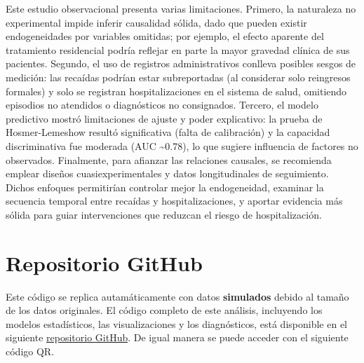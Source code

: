 \documentclass[
  spanish,
  10pt,
]{article}
\begin{document}
Este estudio observacional presenta varias limitaciones. Primero, la
naturaleza no experimental impide inferir causalidad sólida, dado que
pueden existir endogeneidades por variables omitidas; por ejemplo, el
efecto aparente del tratamiento residencial podría reflejar en parte la
mayor gravedad clínica de sus pacientes. Segundo, el uso de registros
administrativos conlleva posibles sesgos de medición: las recaídas
podrían estar subreportadas (al considerar solo reingresos formales) y
solo se registran hospitalizaciones en el sistema de salud, omitiendo
episodios no atendidos o diagnósticos no consignados. Tercero, el modelo
predictivo mostró limitaciones de ajuste y poder explicativo: la prueba
de Hosmer-Lemeshow resultó significativa (falta de calibración) y la
capacidad discriminativa fue moderada (AUC \textasciitilde0.78), lo que
sugiere influencia de factores no observados. Finalmente, para afianzar
las relaciones causales, se recomienda emplear diseños
cuasiexperimentales y datos longitudinales de seguimiento. Dichos
enfoques permitirían controlar mejor la endogeneidad, examinar la
secuencia temporal entre recaídas y hospitalizaciones, y aportar
evidencia más sólida para guiar intervenciones que reduzcan el riesgo de
hospitalización.

\newpage

\section{Repositorio GitHub}\label{repositorio-github}

Este código se replica autamáticamente con datos \textbf{simulados}
debido al tamaño de los datos originales. El código completo de este
análisis, incluyendo los modelos estadísticos, las visualizaciones y los
diagnósticos, está disponible en el siguiente
\href{https://github.com/AmaruSimonAgueroJimenez/Econometria-DCCS}{repositorio
GitHub}. De igual manera se puede acceder con el siguiente código QR.
\end{document}
